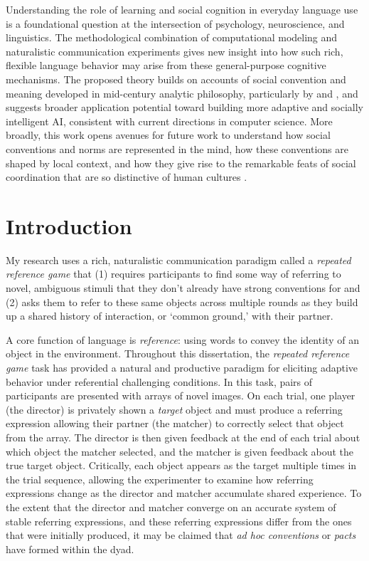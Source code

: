 \documentclass[11pt]{article}
\begin{document}
Understanding the role of learning and social cognition in everyday language use is a foundational question at the intersection of psychology, neuroscience, and linguistics. 
The methodological combination of computational modeling and naturalistic communication experiments gives new insight into how such rich, flexible language behavior may arise from these general-purpose cognitive mechanisms.
The proposed theory builds on accounts of social convention and meaning developed in mid-century analytic philosophy, particularly by  and , and suggests broader application potential toward building more adaptive and socially intelligent AI, consistent with current directions in computer science. 
More broadly, this work opens avenues for future work to understand how social conventions and norms are represented in the mind, how these conventions are shaped by local context, and how they give rise to the remarkable feats of social coordination that are so distinctive of human cultures \cite{hawkins2019emergence}.

\section*{Introduction}


My research uses a rich, naturalistic communication paradigm called a \emph{repeated reference game} that (1) requires participants to find some way of referring to novel, ambiguous stimuli that they don't already have strong conventions for and (2) asks them to refer to these same objects across multiple rounds as they build up a shared history of interaction, or `common ground,' with their partner.


A core function of language is \emph{reference}: using words to convey the identity of an object in the environment. 
Throughout this dissertation, the \emph{repeated reference game} task has provided a natural and productive paradigm for eliciting adaptive behavior under referential challenging conditions.
In this task, pairs of participants are presented with arrays of novel images.
On each trial, one player (the director) is privately shown a \emph{target} object and must produce a referring expression allowing their partner (the matcher) to correctly select that object from the array.
The director is then given feedback at the end of each trial about which object the matcher selected, and the matcher is given feedback about the true target object.
Critically, each object appears as the target multiple times in the trial sequence, allowing the experimenter to examine how referring expressions change as the director and matcher accumulate shared experience.
To the extent that the director and matcher converge on an accurate system of stable referring expressions, and these referring expressions differ from the ones that were initially produced, it may be claimed that \emph{ad hoc conventions} or \emph{pacts} have formed within the dyad.
\end{document}
